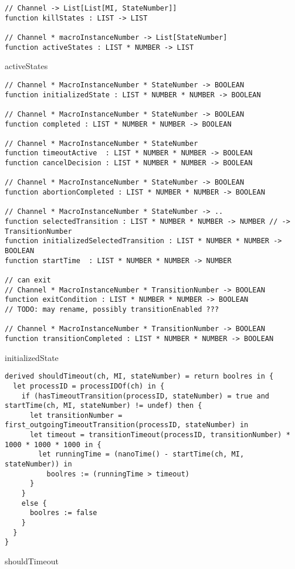 \begin{listing}[H]
\begin{verbatim}
// Channel -> List[List[MI, StateNumber]]
function killStates : LIST -> LIST

// Channel * macroInstanceNumber -> List[StateNumber]
function activeStates : LIST * NUMBER -> LIST
\end{verbatim}
\caption{activeStates}
\label{lst:asm:activeStates}
\end{listing}



\begin{listing}[H]
\begin{verbatim}
// Channel * MacroInstanceNumber * StateNumber -> BOOLEAN
function initializedState : LIST * NUMBER * NUMBER -> BOOLEAN

// Channel * MacroInstanceNumber * StateNumber -> BOOLEAN
function completed : LIST * NUMBER * NUMBER -> BOOLEAN

// Channel * MacroInstanceNumber * StateNumber
function timeoutActive  : LIST * NUMBER * NUMBER -> BOOLEAN
function cancelDecision : LIST * NUMBER * NUMBER -> BOOLEAN

// Channel * MacroInstanceNumber * StateNumber -> BOOLEAN
function abortionCompleted : LIST * NUMBER * NUMBER -> BOOLEAN

// Channel * MacroInstanceNumber * StateNumber -> ..
function selectedTransition : LIST * NUMBER * NUMBER -> NUMBER // -> TransitionNumber
function initializedSelectedTransition : LIST * NUMBER * NUMBER -> BOOLEAN
function startTime  : LIST * NUMBER * NUMBER -> NUMBER

// can exit
// Channel * MacroInstanceNumber * TransitionNumber -> BOOLEAN
function exitCondition : LIST * NUMBER * NUMBER -> BOOLEAN
// TODO: may rename, possibly transitionEnabled ???

// Channel * MacroInstanceNumber * TransitionNumber -> BOOLEAN
function transitionCompleted : LIST * NUMBER * NUMBER -> BOOLEAN
\end{verbatim}
\caption{initializedState}
\label{lst:asm:initializedState}
\end{listing}



\begin{listing}[H]
\begin{verbatim}
derived shouldTimeout(ch, MI, stateNumber) = return boolres in {
  let processID = processIDOf(ch) in {
    if (hasTimeoutTransition(processID, stateNumber) = true and startTime(ch, MI, stateNumber) != undef) then {
      let transitionNumber = first_outgoingTimeoutTransition(processID, stateNumber) in
      let timeout = transitionTimeout(processID, transitionNumber) * 1000 * 1000 * 1000 in {
        let runningTime = (nanoTime() - startTime(ch, MI, stateNumber)) in
          boolres := (runningTime > timeout)
      }
    }
    else {
      boolres := false
    }
  }
}
\end{verbatim}
\caption{shouldTimeout}
\label{lst:asm:shouldTimeout}
\end{listing}


